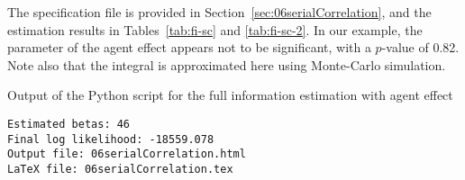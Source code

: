 \documentclass[12pt,a4paper]{article}
\begin{document}
The specification file is provided in
Section~\ref{sec:06serialCorrelation}, and the estimation results in
Tables~\ref{tab:fi-sc} and \ref{tab:fi-sc-2}. In our example, the
parameter of the agent effect appears not to be significant, with a
$p$-value of 0.82. Note also that the integral is approximated here
using Monte-Carlo simulation. 

\begin{table}[htb]
\caption{\label{tab:fi_sc_output}Output of the Python script for the
  full information estimation with agent effect}
  \begin{lstlisting}
Estimated betas: 46
Final log likelihood: -18559.078
Output file: 06serialCorrelation.html
LaTeX file: 06serialCorrelation.tex
  \end{lstlisting}
\end{table}
\end{document}
